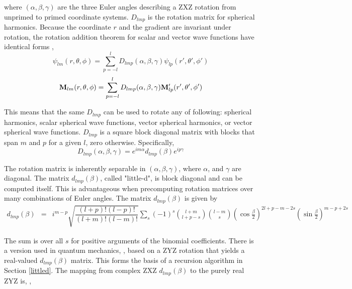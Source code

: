 \noindent where $(\alpha,\beta,\gamma)$ are the three Euler angles describing a ZXZ rotation from unprimed to primed coordinate systems. $D_{lmp}$ is the rotation matrix for spherical harmonics. Because the coordinate $r$ and the gradient are invariant under rotation, the rotation addition theorem for scalar and vector wave functions have identical forms \cite{edmonds1996angular,hansen1988spherical,stein1961addition,dufva2008unified},
\begin{equation}
\psi_{lm}(r,\theta,\phi) = \sum_{p=-l}^{l} D_{lmp}(\alpha,\beta,\gamma) \psi_{lp}(r',\theta',\phi')
\end{equation}
\begin{equation}
\mathbf{M}_{lm}(r,\theta,\phi) = \sum_{p=-l}^{l} D_{lmp}(\alpha,\beta,\gamma)\mathbf{M}_{lp}'(r',\theta',\phi')
\end{equation}

This means that the same $D_{lmp}$ can be used to rotate any of following: spherical harmonics, scalar spherical wave functions, vector spherical harmonics, or vector spherical wave functions. $D_{lmp}$ is a square block diagonal matrix with blocks that span $m$ and $p$ for a given $l$, zero otherwise.  Specifically,
\begin{equation}
D_{lmp}(\alpha,\beta,\gamma) = e^{im\alpha}d_{lmp}(\beta)e^{ip\gamma} \label{dlmpsep}
\end{equation}

The rotation matrix is inherently separable in $(\alpha,\beta,\gamma)$, where $\alpha$, and $\gamma$ are diagonal. The matrix $d_{lmp}(\beta)$, called "little-d", is block diagonal and can be computed itself. This is advantageous when precomputing rotation matrices over many combinations of Euler angles. The matrix $d_{lmp}(\beta)$ is given by 
\begin{eqnarray}
d_{lmp}(\beta) &=&  i^{m-p}\sqrt{\dfrac{(l+p)!(l-p)!}{(l+m)!(l-m)!}} \sum_s (-1)^{s}  {l+m \choose l+p-s} {l-m \choose s}  \left(\cos\frac{\beta}{2}\right)^{2l+p-m-2s}\left(\sin\frac{\beta}{2}\right)^{m-p+2s}  \label{dlmpdirect}
\end{eqnarray}


The sum is over all $s$ for positive arguments of the binomial coefficients. There is a version used in quantum mechanics, \cite{wigner2012group}, based on a ZYZ rotation that yields a real-valued $d_{lmp}(\beta)$ matrix. This forms the basis of a recursion algorithm in Section \ref{littled}. The mapping from complex ZXZ  $d_{lmp}(\beta)$ to the purely real ZYZ is, \cite{littledconversion},




